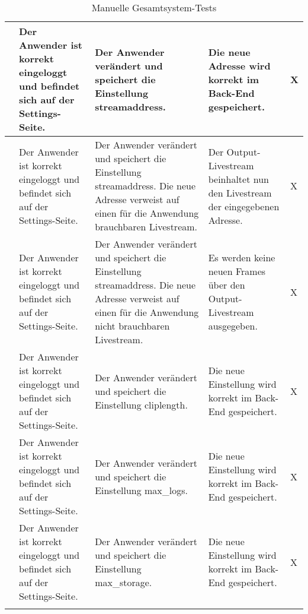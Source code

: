 \begin{longtable}{| p{} | p{} | p{} | p{} | p{} |}
	\stepcounter{SysTestNumber}\arabic{SysTestNumber} & Der Anwender ist korrekt eingeloggt und befindet sich auf der Settings-Seite. & Der Anwender verändert und speichert die Einstellung \glqq{}streamaddress\grqq{}. & Die neue Adresse wird korrekt im Back-End gespeichert. & X \\ \hline
	
	\stepcounter{SysTestNumber}\arabic{SysTestNumber} & Der Anwender ist korrekt eingeloggt und befindet sich auf der Settings-Seite. & Der Anwender verändert und speichert die Einstellung \glqq{}streamaddress\grqq{}. Die neue Adresse verweist auf einen für die Anwendung brauchbaren Livestream. & Der Output-Livestream beinhaltet nun den Livestream der eingegebenen Adresse. & X \\ \hline
	
	\stepcounter{SysTestNumber}\arabic{SysTestNumber} & Der Anwender ist korrekt eingeloggt und befindet sich auf der Settings-Seite. & Der Anwender verändert und speichert die Einstellung \glqq{}streamaddress\grqq{}. Die neue Adresse verweist auf einen für die Anwendung  nicht brauchbaren Livestream. & Es werden keine neuen Frames über den Output-Livestream ausgegeben. & X \\ \hline
	
	\stepcounter{SysTestNumber}\arabic{SysTestNumber} & Der Anwender ist korrekt eingeloggt und befindet sich auf der Settings-Seite. & Der Anwender verändert und speichert die Einstellung \glqq{}cliplength\grqq{}. & Die neue Einstellung wird korrekt im Back-End gespeichert. & X \\ \hline
	
	\stepcounter{SysTestNumber}\arabic{SysTestNumber} & Der Anwender ist korrekt eingeloggt und befindet sich auf der Settings-Seite. & Der Anwender verändert und speichert die Einstellung \glqq{}max\_logs\grqq{}. & Die neue Einstellung wird korrekt im Back-End gespeichert. & X \\ \hline
	
	\stepcounter{SysTestNumber}\arabic{SysTestNumber} & Der Anwender ist korrekt eingeloggt und befindet sich auf der Settings-Seite. & Der Anwender verändert und speichert die Einstellung \glqq{}max\_storage\grqq{}. & Die neue Einstellung wird korrekt im Back-End gespeichert. & X \\ \hline
	
	
	\caption{Manuelle Gesamtsystem-Tests}
	\label{tab:manuelle_gesamtsystem_tests}
\end{longtable}